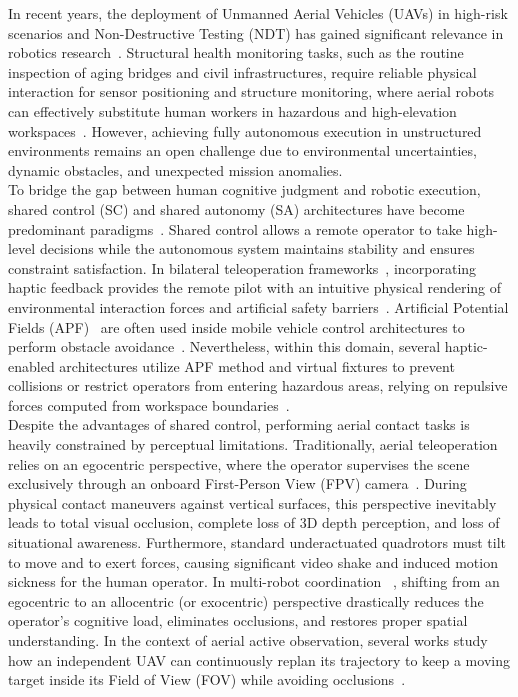 In recent years, the deployment of Unmanned Aerial Vehicles (UAVs) in high-risk scenarios and Non-Destructive Testing (NDT) has gained significant relevance in robotics research~\cite{siciliano2008springer}. Structural health monitoring tasks, such as the routine inspection of aging bridges and civil infrastructures, require reliable physical interaction for sensor positioning and structure monitoring, where aerial robots can effectively substitute human workers in hazardous and high-elevation workspaces~\cite{hao2024bilateral, dangelo2025semi_platform}. However, achieving fully autonomous execution in unstructured environments remains an open challenge due to environmental uncertainties, dynamic obstacles, and unexpected mission anomalies.
\\To bridge the gap between human cognitive judgment and robotic execution, shared control (SC) and shared autonomy (SA) architectures have become predominant paradigms~\cite{selvaggio2021autonomy}. Shared control allows a remote operator to take high-level decisions while the autonomous system maintains stability and ensures constraint satisfaction. In bilateral teleoperation frameworks~\cite{hokayem2006bilateral}, incorporating haptic feedback provides the remote pilot with an intuitive physical rendering of environmental interaction forces and artificial safety barriers~\cite{hao2024bilateral,dangelo2025semi}. 
Artificial Potential Fields (APF)~\cite{khatib1986real} are often used inside mobile vehicle control architectures to perform obstacle avoidance~\cite{franchi2012shared}. Nevertheless, within this domain, several haptic-enabled architectures utilize APF method and virtual fixtures to prevent collisions or restrict operators from entering hazardous areas, relying on repulsive forces computed from workspace boundaries~\cite{rosenberg1993virtual,Lam2009APFteleop}.
\\Despite the advantages of shared control, performing aerial contact tasks is heavily constrained by perceptual limitations. Traditionally, aerial teleoperation relies on an egocentric perspective, where the operator supervises the scene exclusively through an onboard First-Person View (FPV) camera~\cite{jarvis2025first}. During physical contact maneuvers against vertical surfaces, this perspective inevitably leads to total visual occlusion, complete loss of 3D depth perception, and loss of situational awareness. Furthermore, standard underactuated quadrotors must tilt to move and to exert forces, causing significant video shake and induced motion sickness for the human operator. In multi-robot coordination ~\cite{uhde2024allocentric}, shifting from an egocentric to an allocentric (or exocentric) perspective drastically reduces the operator's cognitive load, eliminates occlusions, and restores proper spatial understanding. In the context of aerial active observation, several works study how an independent UAV can continuously replan its trajectory to keep a moving target inside its Field of View (FOV) while avoiding occlusions~\cite{penin2018vision, falanga2018pampc}.
